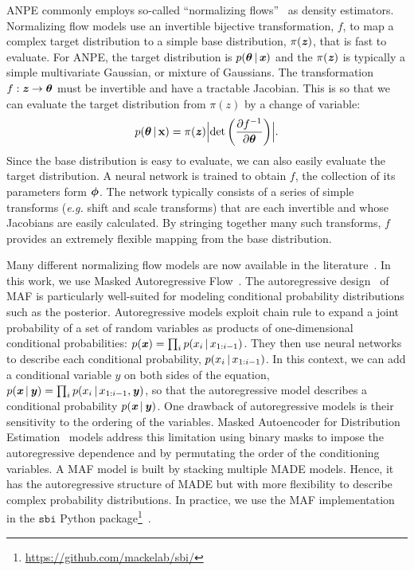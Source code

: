 ANPE commonly employs so-called ``normalizing flows''~\citep{tabak2010,
tabak2013} as density estimators.
Normalizing flow models use an invertible bijective transformation, $f$, to map
a complex target distribution to a simple base distribution, $\pi(\textbf{\textit{z}})$, that is
fast to evaluate.
For ANPE, the target distribution is $p(\boldsymbol{\theta} \,|\, \textbf{\textit{x}})$ and the
$\pi(\textbf{\textit{z}})$ is typically a simple multivariate Gaussian, or mixture of Gaussians.
The transformation $f: \textbf{\textit{z}} \rightarrow \boldsymbol{\theta}$ must be invertible and have a
tractable Jacobian. 
This is so that we can evaluate the target distribution from $\pi(z)$ by a 
change of variable:  
\begin{equation} \label{eq:normflow}
    p(\btheta \given {\bf x}) = \pi(\bfi{z}) \Bigl|{\rm det} \left(\frac{\partial
    f^{-1}}{\partial \btheta} \right)\Bigr|.
\end{equation} 
Since the base distribution is easy to evaluate, we can also easily evaluate
the target distribution.  
A neural network is trained to obtain $f$, the collection of its parameters form $\boldsymbol{\phi}$.
The network typically consists of a series of simple transforms (\emph{e.g.}
shift and scale transforms) that are each invertible and whose Jacobians are
easily calculated. 
By stringing together many such transforms, $f$ provides an extremely flexible
mapping from the base distribution.

Many different normalizing flow models are now available in the
literature~\citep[\emph{e.g.}][]{germain2015, durkan2019}.
In this work, we use Masked Autoregressive
Flow~\citep[MAF;][]{papamakarios2017}. 
The autoregressive design~\citep{uria2016} of MAF is particularly well-suited
for modeling conditional probability distributions such as the posterior. 
Autoregressive models exploit chain rule to expand a joint probability of a set
of random variables as products of one-dimensional conditional
probabilities: $p(\textbf{\textit{x}}) = \prod_i p(x_i\,|\, x_{1:i-1})$. 
They then use neural networks to describe each conditional probability,
$p(x_i\,|\, x_{1:i-1})$. 
In this context, we can add a conditional variable $y$ on both sides of the
equation, $p(\textbf{\textit{x}}\,|\, \textbf{\textit{y}}) = \prod_i p(x_i\,|\, x_{1:i-1}, \textbf{\textit{y}})$, so that the
autoregressive model describes a conditional probability $p(\textbf{\textit{x}}\,|\, \textbf{\textit{y}})$. 
One drawback of autoregressive models is their sensitivity to the ordering of
the variables. 
Masked Autoencoder for Distribution Estimation~\citep[MADE;][]{germain2015}
models address this limitation using binary masks to impose the autoregressive dependence and by permutating the order of the conditioning variables.
A MAF model is built by stacking multiple MADE models.  
Hence, it has the autoregressive structure of MADE but with more flexibility to
describe complex probability distributions.  
In practice, we use the MAF implementation in the $\mathtt{sbi}$ Python
package\footnote{\url{https://github.com/mackelab/sbi/}}~\citep{greenberg2019,
tejero-cantero2020}.
